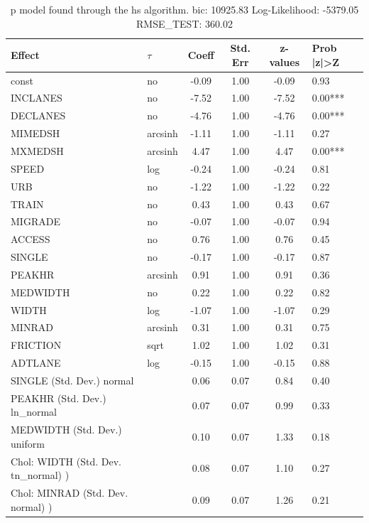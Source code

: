 \begin{table}
	\caption{p model found through the hs algorithm. bic: 10925.83 Log-Likelihood: -5379.05 RMSE_TEST: 360.02}
	\begin{center}
		\begin{tabular}{|l|l|c|c|c|l|}
			\hline
			Effect & $\tau$ & Coeff & Std. Err & z-values & Prob |z|>Z \\
			\hline
			const & no & -0.09 & 1.00 & -0.09 & 0.93 \\
			\hline
			INCLANES & no & -7.52 & 1.00 & -7.52 & 0.00*** \\
			\hline
			DECLANES & no & -4.76 & 1.00 & -4.76 & 0.00*** \\
			\hline
			MIMEDSH & arcsinh & -1.11 & 1.00 & -1.11 & 0.27 \\
			\hline
			MXMEDSH & arcsinh & 4.47 & 1.00 & 4.47 & 0.00*** \\
			\hline
			SPEED & log & -0.24 & 1.00 & -0.24 & 0.81 \\
			\hline
			URB & no & -1.22 & 1.00 & -1.22 & 0.22 \\
			\hline
			TRAIN & no & 0.43 & 1.00 & 0.43 & 0.67 \\
			\hline
			MIGRADE & no & -0.07 & 1.00 & -0.07 & 0.94 \\
			\hline
			ACCESS & no & 0.76 & 1.00 & 0.76 & 0.45 \\
			\hline
			SINGLE & no & -0.17 & 1.00 & -0.17 & 0.87 \\
			\hline
			PEAKHR & arcsinh & 0.91 & 1.00 & 0.91 & 0.36 \\
			\hline
			MEDWIDTH & no & 0.22 & 1.00 & 0.22 & 0.82 \\
			\hline
			WIDTH & log & -1.07 & 1.00 & -1.07 & 0.29 \\
			\hline
			MINRAD & arcsinh & 0.31 & 1.00 & 0.31 & 0.75 \\
			\hline
			FRICTION & sqrt & 1.02 & 1.00 & 1.02 & 0.31 \\
			\hline
			ADTLANE & log & -0.15 & 1.00 & -0.15 & 0.88 \\
			\hline
			SINGLE (Std. Dev.) normal &  & 0.06 & 0.07 & 0.84 & 0.40 \\
			\hline
			PEAKHR (Std. Dev.) ln_normal &  & 0.07 & 0.07 & 0.99 & 0.33 \\
			\hline
			MEDWIDTH (Std. Dev.) uniform &  & 0.10 & 0.07 & 1.33 & 0.18 \\
			\hline
			 Chol: WIDTH (Std. Dev. tn_normal) ) &  & 0.08 & 0.07 & 1.10 & 0.27 \\
			\hline
			 Chol: MINRAD (Std. Dev. normal) ) &  & 0.09 & 0.07 & 1.26 & 0.21 \\

\end{tabular}
\end{center}
\end{table}
